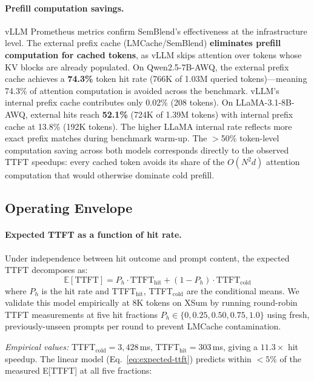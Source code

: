 \documentclass[10pt,twocolumn]{article}
\begin{document}
\paragraph{Prefill computation savings.}
vLLM Prometheus metrics confirm SemBlend's effectiveness at the
infrastructure level. The external prefix cache (LMCache/SemBlend)
\textbf{eliminates prefill computation for cached tokens}, as vLLM
skips attention over tokens whose KV blocks are already populated.
On Qwen2.5-7B-AWQ, the external prefix cache achieves a \textbf{74.3\%}
token hit rate (766K of 1.03M queried tokens)---meaning 74.3\% of
attention computation is avoided across the benchmark. vLLM's internal
prefix cache contributes only 0.02\% (208 tokens). On LLaMA-3.1-8B-AWQ,
external hits reach \textbf{52.1\%} (724K of 1.39M tokens) with
internal prefix cache at 13.8\% (192K tokens). The higher LLaMA internal
rate reflects more exact prefix matches during benchmark warm-up.
The $>$50\% token-level computation saving across both models corresponds
directly to the observed TTFT speedups: every cached token avoids its
share of the $O(N^2 d)$ attention computation that would otherwise
dominate cold prefill.

\subsection{Operating Envelope}
\label{sec:operating-envelope}

\paragraph{Expected TTFT as a function of hit rate.}
Under independence between hit outcome and prompt content,
the expected TTFT decomposes as:
\begin{equation}
  \mathbb{E}[\text{TTFT}] = P_h \cdot \text{TTFT}_\text{hit}
    + (1 - P_h) \cdot \text{TTFT}_\text{cold}
  \label{eq:expected-ttft}
\end{equation}
where $P_h$ is the hit rate and TTFT$_\text{hit}$, TTFT$_\text{cold}$
are the conditional means.
We validate this model empirically at 8K tokens on XSum
by running round-robin TTFT measurements at five hit fractions
$P_h \in \{0, 0.25, 0.50, 0.75, 1.0\}$ using fresh, previously-unseen
prompts per round to prevent LMCache contamination.

\emph{Empirical values:} TTFT$_\text{cold} = 3{,}428$\,ms,
TTFT$_\text{hit} = 303$\,ms, giving a $\mathbf{11.3\times}$ hit speedup.
The linear model (Eq.~\ref{eq:expected-ttft}) predicts within ${<}5\%$
of the measured E[TTFT] at all five fractions:
\end{document}
